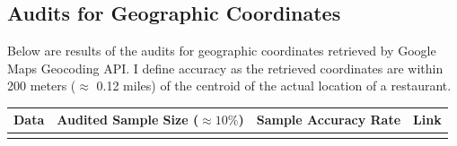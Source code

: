 \documentclass[letterpaper, 12pt]{article}
\begin{document}
\begin{appendices}
\pagebreak
\clearpage
\section{Audits for Geographic Coordinates} \label{appendix:audits}
Below are results of the audits for geographic coordinates retrieved by Google Maps Geocoding API. I define accuracy as the retrieved coordinates are within 200 meters ($\approx$ 0.12 miles) of the centroid of the actual location of a restaurant. \\
\begin{table}[h!]
\setlength\extrarowheight{2pt} %
\begin{tabularx}{\textwidth}{CCCC}
\toprule
\textbf{Data} & \textbf{Audited Sample Size ($\approx 10\%$)} & \textbf{Sample Accuracy Rate} & \textbf{Link}  \\
\midrule
{} &    &  & \\
\bottomrule
\end{tabularx}
\end{table}









\end{appendices}
\end{document}
